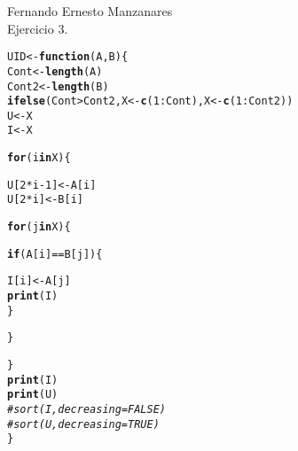 \documentclass{article}\usepackage[]{graphicx}\usepackage[]{color}
\makeatletter
\newcommand{\hlnum}[1]{\textcolor[rgb]{0.686,0.059,0.569}{#1}}%
\newcommand{\hlcom}[1]{\textcolor[rgb]{0.678,0.584,0.686}{\textit{#1}}}%
\newcommand{\hlopt}[1]{\textcolor[rgb]{0,0,0}{#1}}%
\newcommand{\hlstd}[1]{\textcolor[rgb]{0.345,0.345,0.345}{#1}}%
\newcommand{\hlkwa}[1]{\textcolor[rgb]{0.161,0.373,0.58}{\textbf{#1}}}%
\newcommand{\hlkwb}[1]{\textcolor[rgb]{0.69,0.353,0.396}{#1}}%
\newcommand{\hlkwc}[1]{\textcolor[rgb]{0.333,0.667,0.333}{#1}}%
\newcommand{\hlkwd}[1]{\textcolor[rgb]{0.737,0.353,0.396}{\textbf{#1}}}%
\newenvironment{kframe}{%
 \def\at@end@of@kframe{}%
 \ifinner\ifhmode%
  \def\at@end@of@kframe{\end{minipage}}%
  \begin{minipage}{\columnwidth}%
 \fi\fi%
 \def\FrameCommand##1{\hskip\@totalleftmargin \hskip-\fboxsep
 \colorbox{shadecolor}{##1}\hskip-\fboxsep
     \hskip-\linewidth \hskip-\@totalleftmargin \hskip\columnwidth}%
 \MakeFramed {\advance\hsize-\width
   \@totalleftmargin\z@ \linewidth\hsize
   \@setminipage}}%
 {\par\unskip\endMakeFramed%
 \at@end@of@kframe}
\newenvironment{knitrout}{}{} %
\makeatother
\begin{document}
Fernando Ernesto Manzanares\\
Ejercicio 3.
\begin{knitrout}
\color{fgcolor}\begin{kframe}
\begin{alltt}
\hlstd{UID}\hlkwb{<-} \hlkwa{function}\hlstd{(}\hlkwc{A}\hlstd{,}\hlkwc{B}\hlstd{)\{}
  \hlstd{Cont}\hlkwb{<-}\hlkwd{length}\hlstd{(A)}
  \hlstd{Cont2}\hlkwb{<-} \hlkwd{length}\hlstd{(B)}
  \hlkwd{ifelse}\hlstd{(Cont}\hlopt{>}\hlstd{Cont2, X}\hlkwb{<-}\hlkwd{c}\hlstd{(}\hlnum{1}\hlopt{:}\hlstd{Cont),X}\hlkwb{<-}\hlkwd{c}\hlstd{(}\hlnum{1}\hlopt{:}\hlstd{Cont2))}
  \hlstd{U}\hlkwb{<-} \hlstd{X}
  \hlstd{I}\hlkwb{<-} \hlstd{X}

    \hlkwa{for} \hlstd{(i} \hlkwa{in} \hlstd{X) \{}

      \hlstd{U[}\hlnum{2}\hlopt{*}\hlstd{i}\hlopt{-}\hlnum{1}\hlstd{]}\hlkwb{<-}\hlstd{A[i]}
      \hlstd{U[}\hlnum{2}\hlopt{*}\hlstd{i]}\hlkwb{<-}\hlstd{B[i]}

      \hlkwa{for} \hlstd{(j} \hlkwa{in} \hlstd{X) \{}

        \hlkwa{if} \hlstd{(A[i]}\hlopt{==}\hlstd{B[j]) \{}

          \hlstd{I[i]}\hlkwb{<-}\hlstd{A[j]}
          \hlkwd{print}\hlstd{(I)}
      \hlstd{\}}

    \hlstd{\}}

    \hlstd{\}}
    \hlkwd{print}\hlstd{(I)}
    \hlkwd{print}\hlstd{(U)}
  \hlcom{#sort(I, decreasing = FALSE)}
  \hlcom{#sort(U,decreasing = TRUE)}
\hlstd{\}}
\end{alltt}
\end{kframe}
\end{knitrout}
\end{document}
